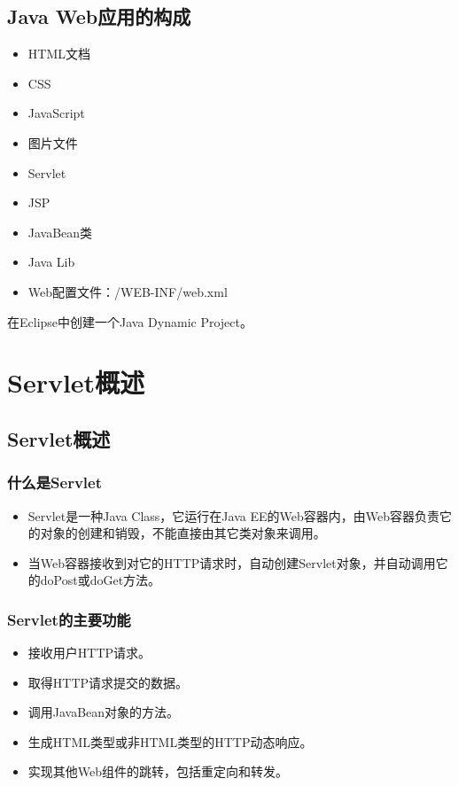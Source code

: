 \subsection{Java Web应用的构成}

\begin{itemize}
\item HTML文档
\item CSS
\item JavaScript
\item 图片文件
\item Servlet
\item JSP
\item JavaBean类
\item Java Lib
\item Web配置文件：/WEB-INF/web.xml
\end{itemize}

 在Eclipse中创建一个Java Dynamic Project。

\section{Servlet概述}

\subsection{Servlet概述}

\subsubsection{什么是Servlet} 

\begin{itemize}
\item Servlet是一种Java Class，它运行在Java EE的Web容器内，由Web容器负责它的对象的创建和销毁，不能直接由其它类对象来调用。
\item 当Web容器接收到对它的HTTP请求时，自动创建Servlet对象，并自动调用它的doPost或doGet方法。
\end{itemize}

\subsubsection{Servlet的主要功能}

\begin{itemize}
\item 接收用户HTTP请求。
\item 取得HTTP请求提交的数据。
\item 调用JavaBean对象的方法。
\item 生成HTML类型或非HTML类型的HTTP动态响应。
\item 实现其他Web组件的跳转，包括重定向和转发。
\end{itemize}


